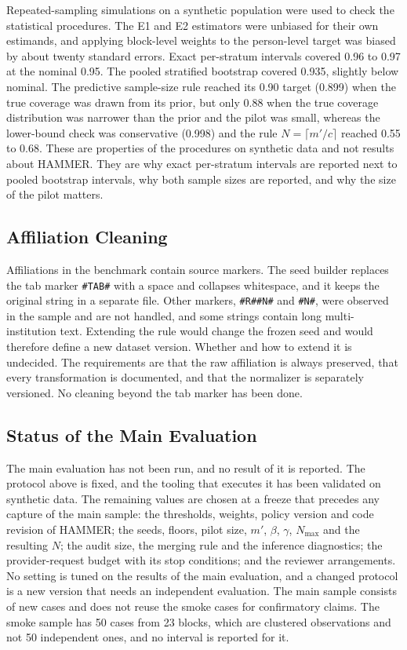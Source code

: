 Repeated-sampling simulations on a synthetic population were used to check the statistical procedures. The E1 and E2 estimators were unbiased for their own estimands, and applying block-level weights to the person-level target was biased by about twenty standard errors. Exact per-stratum intervals covered 0.96 to 0.97 at the nominal 0.95. The pooled stratified bootstrap covered 0.935, slightly below nominal. The predictive sample-size rule reached its 0.90 target (0.899) when the true coverage was drawn from its prior, but only 0.88 when the true coverage distribution was narrower than the prior and the pilot was small, whereas the lower-bound check was conservative (0.998) and the rule $N=\lceil m'/c\rceil$ reached 0.55 to 0.68. These are properties of the procedures on synthetic data and not results about HAMMER. They are why exact per-stratum intervals are reported next to pooled bootstrap intervals, why both sample sizes are reported, and why the size of the pilot matters.

\subsection{Affiliation Cleaning}
\label{sec:affiliation}
Affiliations in the benchmark contain source markers. The seed builder replaces the tab marker \texttt{\#TAB\#} with a space and collapses whitespace, and it keeps the original string in a separate file. Other markers, \texttt{\#R\#\#N\#} and \texttt{\#N\#}, were observed in the sample and are not handled, and some strings contain long multi-institution text. Extending the rule would change the frozen seed and would therefore define a new dataset version. Whether and how to extend it is undecided. The requirements are that the raw affiliation is always preserved, that every transformation is documented, and that the normalizer is separately versioned. No cleaning beyond the tab marker has been done.

\subsection{Status of the Main Evaluation}
\label{sec:main}
The main evaluation has not been run, and no result of it is reported. The protocol above is fixed, and the tooling that executes it has been validated on synthetic data. The remaining values are chosen at a freeze that precedes any capture of the main sample: the thresholds, weights, policy version and code revision of HAMMER; the seeds, floors, pilot size, $m'$, $\beta$, $\gamma$, $N_{\max}$ and the resulting $N$; the audit size, the merging rule and the inference diagnostics; the provider-request budget with its stop conditions; and the reviewer arrangements. No setting is tuned on the results of the main evaluation, and a changed protocol is a new version that needs an independent evaluation. The main sample consists of new cases and does not reuse the smoke cases for confirmatory claims. The smoke sample has 50 cases from 23 blocks, which are clustered observations and not 50 independent ones, and no interval is reported for it.
